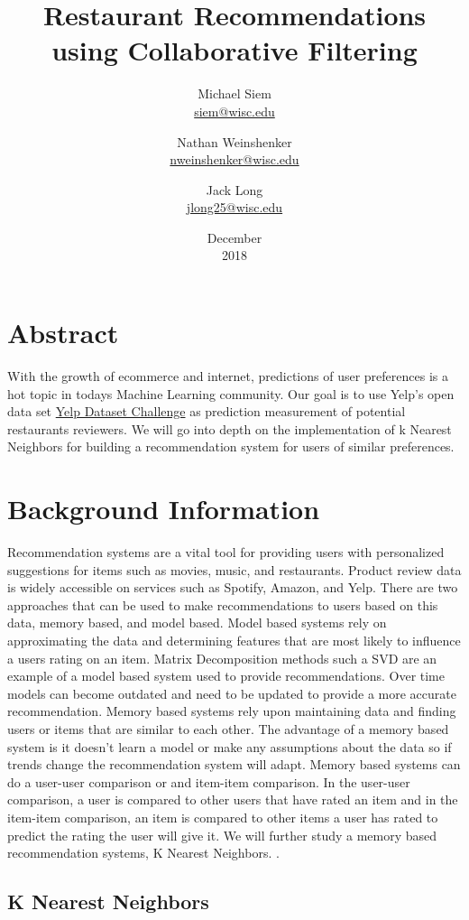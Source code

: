 \documentclass{report}
\title{Restaurant Recommendations using Collaborative Filtering}
\date{December\\ 2018}
\author{Michael Siem \\ \href{mailto:siem@wisc.edu}{siem@wisc.edu}
	\and Nathan Weinshenker \\ \href{mailto:nweinshenker@wisc.edu}{nweinshenker@wisc.edu}
	\and Jack Long \\ \href{mailto:jlong25@wisc.edu}{jlong25@wisc.edu}}
\begin{document}
\maketitle

\section*{Abstract}
With the growth of ecommerce and internet, predictions of user preferences is a hot topic in todays Machine Learning community. Our goal is to use Yelp's open data set \href {https://www.yelp.com/dataset/challenge} {Yelp Dataset Challenge} as prediction measurement of potential restaurants reviewers. We will go into depth on the implementation of k Nearest Neighbors for building a recommendation system for users of similar preferences.  

\section*{Background Information}

Recommendation systems are a vital tool for providing users with personalized suggestions for items such as movies, music, and restaurants.
Product review data is widely accessible on services such as Spotify, Amazon, and Yelp.
There are two approaches that can be used to make recommendations to users based on this data, memory based, and model based.
Model based systems rely on approximating the data and determining features that are most likely to influence a users rating on an item. 
Matrix Decomposition methods such a SVD are an example of a model based system used to provide recommendations.
Over time models can become outdated and need to be updated to provide a more accurate recommendation.
Memory based systems rely upon maintaining data and finding users or items that are similar to each other.
The advantage of a memory based system is it doesn't learn a model or make any assumptions about the data so if trends change the recommendation system will adapt.
Memory based systems can do a user-user comparison or and item-item comparison.
In the user-user comparison, a user is compared to other users that have rated an item and in the item-item comparison, an item is compared to other items a user has rated to predict the rating the user will give it.
We will further study a memory based recommendation systems, K Nearest Neighbors.
\cite{5}.
	
\subsection*{K Nearest Neighbors}
	
\end{document}
